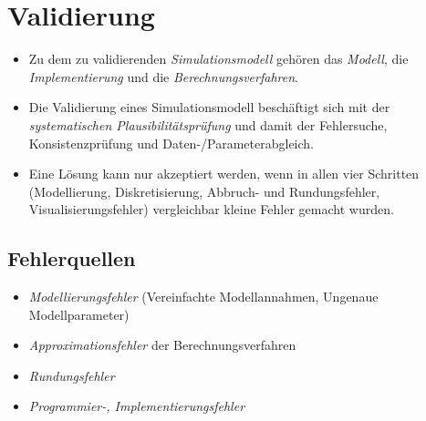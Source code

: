 
\chapter{Validierung} %
    \label{c:simvalidierung}

    \begin{itemize}
    	\item Zu dem zu validierenden \textit{Simulationsmodell} gehören das \textit{Modell}, die \textit{Implementierung} und die \textit{Berechnungsverfahren}.
    	\item Die Validierung eines Simulationsmodell beschäftigt sich mit der \textit{systematischen Plausibilitätsprüfung} und damit der Fehlersuche, Konsistenzprüfung und Daten-/Parameterabgleich.
    	\item Eine Lösung kann nur akzeptiert werden, wenn in allen vier Schritten (Modellierung, Diskretisierung, Abbruch- und Rundungsfehler, Visualisierungsfehler) vergleichbar kleine Fehler gemacht wurden.
    \end{itemize}

    \section{Fehlerquellen} %
        \begin{itemize}
        	\item \textit{Modellierungsfehler} (Vereinfachte Modellannahmen, Ungenaue Modellparameter)
        	\item \textit{Approximationsfehler} der Berechnungsverfahren
        	\item \textit{Rundungsfehler}
        	\item \textit{Programmier-, Implementierungsfehler}
        \end{itemize}

